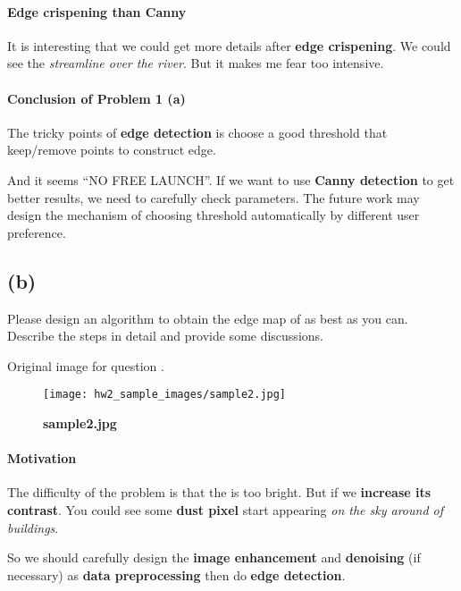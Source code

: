 \paragraph{Edge crispening than Canny}
It is interesting that we could get more \alert{details} after \textbf{edge crispening}. We could see the \textit{streamline over the river}. But it makes me fear too intensive.

\paragraph{Conclusion of Problem 1 (a)}
The tricky points of \textbf{edge detection} is choose a \alert{good threshold} that keep/remove points to construct edge.

And it seems ``NO FREE LAUNCH''. If we want to use \textbf{Canny detection} to get better results, we need to carefully check parameters. The future work may design the mechanism of choosing threshold automatically by different user preference.

\subsection{(b)}\label{1_b}
Please design an algorithm to obtain the edge map of  as best as you can. Describe the steps in detail and provide some discussions.

Original image  for question .
\begin{figure}
    \centering
    \texttt{[image: hw2\_sample\_images/sample2.jpg]}
    \caption{\textbf{sample2.jpg}}
    \label{sample2}
\end{figure}

\paragraph{Motivation}
The difficulty of the problem is that the  is too bright. But if we \textbf{increase its contrast}. You could see some \textbf{dust pixel} start appearing \textit{on the sky around of buildings}.

So we should carefully design the \textbf{image enhancement} and \textbf{denoising} (if necessary) as \textbf{data preprocessing} then do \textbf{edge detection}.

